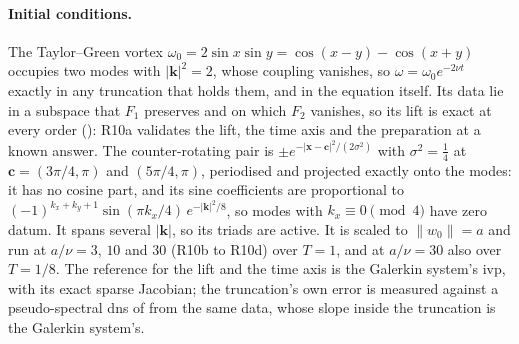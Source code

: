 \paragraph{Initial conditions.} The Taylor--Green vortex $\omega_0=2\sin x\sin y=\cos(x-y)-\cos(x+y)$ occupies two modes with $|\mathbf k|^2=2$, whose coupling vanishes, so $\omega=\omega_0e^{-2\nu t}$ exactly in any truncation that holds them, and in the equation itself. Its data lie in a subspace that $F_1$ preserves and on which $F_2$ vanishes, so its lift is exact at every order (): R10a validates the lift, the time axis and the preparation at a known answer. The counter-rotating pair is $\pm e^{-|\mathbf x-\mathbf c|^2/(2\sigma^2)}$ with $\sigma^2=\tfrac14$ at $\mathbf c=(3\pi/4,\pi)$ and $(5\pi/4,\pi)$, periodised and projected exactly onto the modes: it has no cosine part, and its sine coefficients are proportional to $(-1)^{k_x+k_y+1}\sin(\pi k_x/4)\,e^{-|\mathbf k|^2/8}$, so modes with $k_x\equiv0\pmod4$ have zero datum. It spans several $|\mathbf k|$, so its triads are active. It is scaled to $\|w_0\|=a$ and run at $a/\nu=3$, $10$ and $30$ (R10b to R10d) over $T=1$, and at $a/\nu=30$ also over $T=1/8$. The reference for the lift and the time axis is the Galerkin system's \gls{ivp}, with its exact sparse Jacobian; the truncation's own error is measured against a pseudo-spectral \gls{dns} of  from the same data, whose slope inside the truncation is the Galerkin system's.
